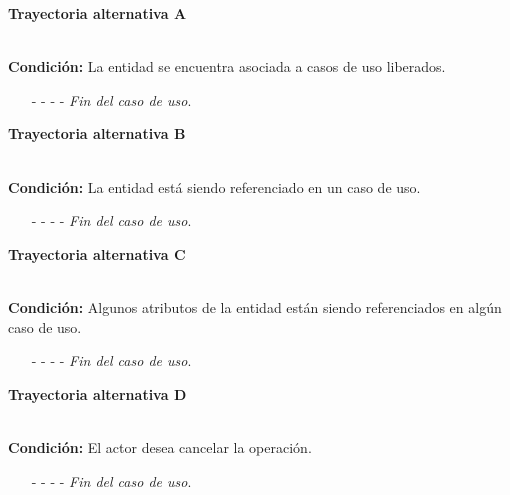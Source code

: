 \hypertarget{CU7-3:TAA}{\textbf{Trayectoria alternativa A}}\\
\noindent \textbf{Condición:} La entidad se encuentra asociada a casos de uso liberados.
\begin{enumerate}
	\UCpaso[\UCsist] Oculta el botón \eliminar de la entidad que esta asociada a casos de uso liberados.
	\item[- -] - - {\em {Fin del caso de uso}}.
\end{enumerate}
\hypertarget{CU7-3:TAB}{\textbf{Trayectoria alternativa B}}\\
\noindent \textbf{Condición:} La entidad está siendo referenciado en un caso de uso.
\begin{enumerate}
	\UCpaso[\UCsist] Muestra el mensaje  en la pantalla  en una pantalla emergente con la lista de casos de uso que están referenciando a la entidad.
	\UCpaso[\UCactor] Oprime el botón  de la pantalla emergente.
	\UCpaso[\UCsist] Muestra la pantalla .
	\item[- -] - - {\em {Fin del caso de uso}}.
\end{enumerate}
\hypertarget{CU7-3:TAC}{\textbf{Trayectoria alternativa C}}\\
\noindent \textbf{Condición:} Algunos atributos de la entidad están siendo referenciados en algún caso de uso.
\begin{enumerate}
	\UCpaso[\UCsist] Muestra el mensaje  en la pantalla  en una pantalla emergente con la lista de elementos que están referenciando al atributo de la entidad.
	\UCpaso[\UCactor] Oprime el botón  de la pantalla emergente.
	\UCpaso[\UCsist] Muestra la pantalla .
	\item[- -] - - {\em {Fin del caso de uso}}.
\end{enumerate}
\hypertarget{CU7-3:TAD}{\textbf{Trayectoria alternativa D}}\\
\noindent \textbf{Condición:} El actor desea cancelar la operación.
\begin{enumerate}
	\UCpaso[\UCactor] Oprime el botón  de la pantalla emergente.
	\UCpaso[\UCsist] Muestra la pantalla .
	\item[- -] - - {\em {Fin del caso de uso}}.%
\end{enumerate}
	

